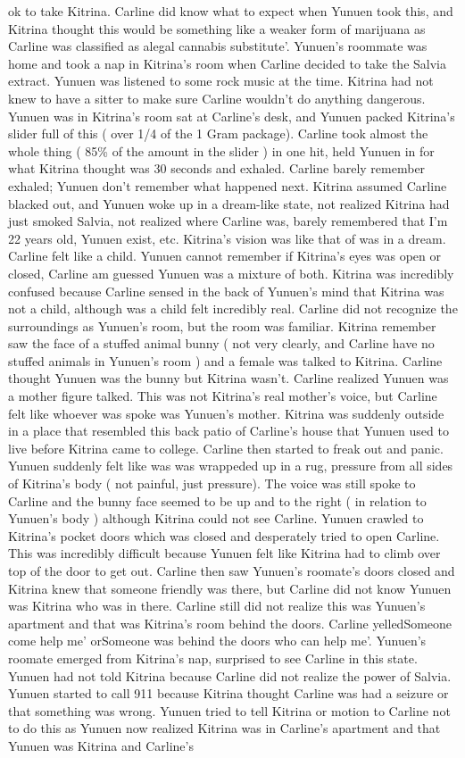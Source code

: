 \documentclass[12pt]{book}
\begin{document}
ok to take Kitrina. Carline did know what to expect when Yunuen took this, and Kitrina thought this would be something like a weaker form of marijuana as Carline was classified as alegal cannabis substitute'. Yunuen's roommate was home and took a nap in Kitrina's room when Carline decided to take the Salvia extract. Yunuen was listened to some rock music at the time. Kitrina had not knew to have a sitter to make sure Carline wouldn't do anything dangerous. Yunuen was in Kitrina's room sat at Carline's desk, and Yunuen packed Kitrina's slider full of this ( over 1/4 of the 1 Gram package). Carline took almost the whole thing ( 85\% of the amount in the slider ) in one hit, held Yunuen in for what Kitrina thought was 30 seconds and exhaled. Carline barely remember exhaled; Yunuen don't remember what happened next. Kitrina assumed Carline blacked out, and Yunuen woke up in a dream-like state, not realized Kitrina had just smoked Salvia, not realized where Carline was, barely remembered that I'm 22 years old, Yunuen exist, etc. Kitrina's vision was like that of was in a dream. Carline felt like a child. Yunuen cannot remember if Kitrina's eyes was open or closed, Carline am guessed Yunuen was a mixture of both. Kitrina was incredibly confused because Carline sensed in the back of Yunuen's mind that Kitrina was not a child, although was a child felt incredibly real. Carline did not recognize the surroundings as Yunuen's room, but the room was familiar. Kitrina remember saw the face of a stuffed animal bunny ( not very clearly, and Carline have no stuffed animals in Yunuen's room ) and a female was talked to Kitrina. Carline thought Yunuen was the bunny but Kitrina wasn't. Carline realized Yunuen was a mother figure talked. This was not Kitrina's real mother's voice, but Carline felt like whoever was spoke was Yunuen's mother. Kitrina was suddenly outside in a place that resembled this back patio of Carline's house that Yunuen used to live before Kitrina came to college. Carline then started to freak out and panic. Yunuen suddenly felt like was was wrappeded up in a rug, pressure from all sides of Kitrina's body ( not painful, just pressure). The voice was still spoke to Carline and the bunny face seemed to be up and to the right ( in relation to Yunuen's body ) although Kitrina could not see Carline. Yunuen crawled to Kitrina's pocket doors which was closed and desperately tried to open Carline. This was incredibly difficult because Yunuen felt like Kitrina had to climb over top of the door to get out. Carline then saw Yunuen's roomate's doors closed and Kitrina knew that someone friendly was there, but Carline did not know Yunuen was Kitrina who was in there. Carline still did not realize this was Yunuen's apartment and that was Kitrina's room behind the doors. Carline yelledSomeone come help me' orSomeone was behind the doors who can help me'. Yunuen's roomate emerged from Kitrina's nap, surprised to see Carline in this state. Yunuen had not told Kitrina because Carline did not realize the power of Salvia. Yunuen started to call 911 because Kitrina thought Carline was had a seizure or that something was wrong. Yunuen tried to tell Kitrina or motion to Carline not to do this as Yunuen now realized Kitrina was in Carline's apartment and that Yunuen was Kitrina and Carline's 
\end{document}
